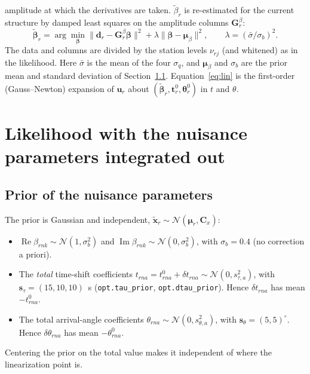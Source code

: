 \documentclass[11pt]{article}
\newcommand{\Real}{\operatorname{Re}}
\newcommand{\Imag}{\operatorname{Im}}
\begin{document}
amplitude at which the derivatives are taken. $\tilde\beta_r$ is
re-estimated for the current structure by damped least squares on the
amplitude columns $\mathbf{G}^\beta_r$:
\begin{equation}
 \tilde{\bm\beta}_r=\arg\min_{\bm\beta}\|\mathbf{d}_r-\mathbf{G}^\beta_r\bm\beta\|^2+\lambda\|\bm\beta-\bm\mu_\beta\|^2,\qquad
 \lambda=(\bar\sigma/\sigma_b)^2 .
\end{equation}
The data and columns are divided by the station levels $\nu_{rj}$ (and
whitened) as in the likelihood. Here $\bar\sigma$ is the mean of the four $\sigma_q$, and $\bm\mu_\beta$ and
$\sigma_b$ are the prior mean and standard deviation of
Section~\ref{sec:nuisprior}. Equation~\eqref{eq:lin} is the first-order
(Gauss--Newton) expansion of $\mathbf{u}_r$ about
$(\tilde{\bm\beta}_r,\mathbf{t}^0_r,\bm\theta^0_r)$ in $t$ and $\theta$.

\section{Likelihood with the nuisance parameters integrated out}\label{sec:like}


\subsection{Prior of the nuisance parameters}\label{sec:nuisprior}
The prior is Gaussian and independent, $\tilde{\mathbf{x}}_r\sim\mathcal{N}(\bm\mu_r,\mathbf{C}_x)$:
\begin{itemize}
\item $\Real\beta_{rnk}\sim\mathcal{N}(1,\sigma_b^2)$ and
  $\Imag\beta_{rnk}\sim\mathcal{N}(0,\sigma_b^2)$, with $\sigma_b=0.4$
  (no correction a priori).
\item The \emph{total} time-shift coefficients
  $t_{rna}=t^0_{rna}+\delta t_{rna}\sim\mathcal{N}(0,s_{\tau,a}^2)$, with
  $\mathbf{s}_\tau=(15,10,10)$~s (\texttt{opt.tau\_prior},
  \texttt{opt.dtau\_prior}). Hence $\delta t_{rna}$ has mean $-t^0_{rna}$.
\item The total arrival-angle coefficients
  $\theta_{rna}\sim\mathcal{N}(0,s_{\theta,a}^2)$, with
  $\mathbf{s}_\theta=(5,5)^\circ$. Hence $\delta\theta_{rna}$ has mean
  $-\theta^0_{rna}$.
\end{itemize}
Centering the prior on the total value makes it independent of where the
linearization point is.
\end{document}
